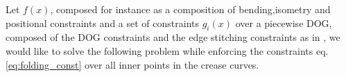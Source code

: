 Let $f(x)$, composed for instance as a composition of bending,isometry and positional constraints and a set of constraints $g_i(x)$ over a piecewise DOG, composed of the DOG constraints and the edge stitching constraints as in \cite{rabi2018shape}, we would like to solve the following problem while enforcing the constraints eq.\eqref{eq:folding_const} over all inner points in the crease curves.
